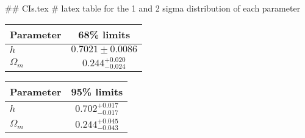 ## CIs.tex
# latex table for the 1 and 2 sigma distribution of each parameter

\begin{tabular} { l  c}
 Parameter &  68\% limits\\
\hline
{\boldmath$h              $} & $0.7021\pm 0.0086          $\\
{\boldmath$\Omega_m       $} & $0.244^{+0.020}_{-0.024}   $\\
\hline
\end{tabular}

\begin{tabular} { l  c}
 Parameter &  95\% limits\\
\hline
{\boldmath$h              $} & $0.702^{+0.017}_{-0.017}   $\\
{\boldmath$\Omega_m       $} & $0.244^{+0.045}_{-0.043}   $\\
\hline
\end{tabular}
